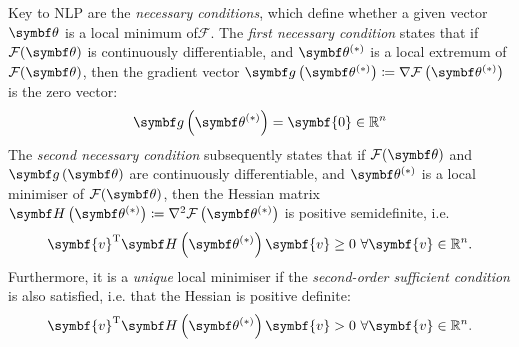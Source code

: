 Key to \ac{NLP} are the \emph{necessary conditions}, which define whether a
given vector $\bth$ is a local minimum of$\mathcal{F}$.
The \emph{first necessary condition} states
that if $\Fth$ is continuously differentiable, and $\bthstar$ is a local extremum of
$\Fth$, then the gradient vector $\bdgthstar \coloneq \nabla \Fthstar$ is the
zero vector:
\begin{equation}
    \bdgthstar = \symbf{0} \in \mathbb{R}^n
\end{equation}
The \emph{second necessary condition} subsequently states that
if $\Fth$ and $\bdgth$ are continuously differentiable, and $\bthstar$ is a
local minimiser of $\Fth$, then the Hessian matrix $\bdHthstar \coloneq
\nabla^2 \Fthstar$ is positive semidefinite, i.e.
\begin{equation}
  \symbf{v}^{\mathrm{T}} \bdHthstar \symbf{v} \geq 0\ \forall \symbf{v} \in \mathbb{R}^n.
\end{equation}
Furthermore, it is a \emph{unique} local minimiser if the \emph{second-order
sufficient condition} is also satisfied, i.e. that the Hessian is positive
definite:
\begin{equation}
    \symbf{v}^{\mathrm{T}} \bdHthstar \symbf{v} > 0\ \forall \symbf{v} \in \mathbb{R}^n.
\end{equation}

